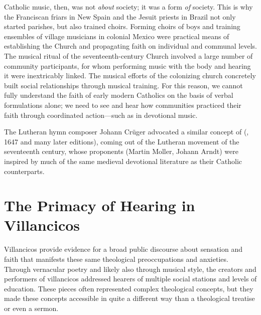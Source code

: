 Catholic music, then, was not \emph{about} society; it was a form \emph{of}
society.
This is why the Franciscan friars in New Spain and the Jesuit priests in Brazil
not only started parishes, but also trained choirs.
Forming choirs of boys and training ensembles of village musicians in colonial
Mexico were practical means of establishing the Church and propagating faith on
individual and communal levels.
The musical ritual of the seventeenth-century Church involved a large number of
community participants, for whom performing music with the body and hearing it
were inextricably linked.
The musical efforts of the colonizing church concretely built social
relationships through musical training.%
    \Autocite{RamosKittrell:PlayingCathedral}
For this reason, we cannot fully understand the faith of early modern Catholics
on the basis of verbal formulations alone; we need to see and hear how
communities practiced their faith through coordinated action---such as in
devotional music.%
\begin{Footnote}
    The Lutheran hymn composer Johann Crüger advocated a similar concept of
     (,
    1647 and many later editions), coming out of the Lutheran 
    movement of the seventeenth century, whose proponents (Martin Moller, Johann
    Arndt) were inspired by much of the same medieval devotional literature as
    their Catholic counterparts.
\end{Footnote}

\section{The Primacy of Hearing in Villancicos}

Villancicos provide evidence for a broad public discourse about sensation and
faith that manifests these same theological preoccupations and anxieties.
Through vernacular poetry and likely also through musical style, the creators
and performers of villancicos addressed hearers of multiple social stations and
levels of education.
These pieces often represented complex theological concepts, but they made these
concepts accessible in quite a different way than a theological treatise or even
a sermon.

